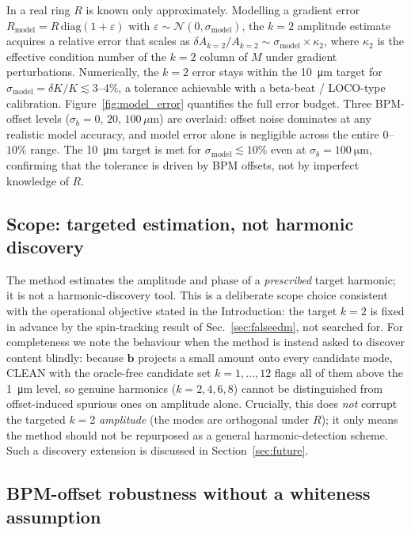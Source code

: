 \documentclass[preprint,12pt]{elsarticle}
\begin{document}
In a real ring $R$ is known only approximately. Modelling a gradient
error $R_\mathrm{model}=R\,\mathrm{diag}(1+\varepsilon)$ with
$\varepsilon\sim\mathcal{N}(0,\sigma_\mathrm{model})$, the $k=2$ amplitude
estimate acquires a relative error that scales as
$\delta A_{k=2}/A_{k=2}\sim\sigma_\mathrm{model}\times\kappa_2$, where
$\kappa_2$ is the effective condition number of the $k=2$ column of $M$
under gradient perturbations. Numerically, the $k=2$ error
stays within the \SI{10}{\micro\meter} target for
$\sigma_\mathrm{model}=\delta K/K\lesssim3\text{--}4\%$, a tolerance
achievable with a beta-beat / LOCO-type calibration.
Figure~\ref{fig:model_error} quantifies the full error budget.
Three BPM-offset levels ($\sigma_b = 0$, $20$, $100\,\mu$m) are overlaid:
offset noise dominates at any realistic model accuracy, and model error
alone is negligible across the entire $0$--$10\%$ range.
The \SI{10}{\micro\meter} target is met for $\sigma_\mathrm{model}\lesssim10\%$
even at $\sigma_b=\SI{100}{\micro\meter}$,
confirming that the tolerance is driven by BPM offsets, not by imperfect
knowledge of $R$.

\subsection{Scope: targeted estimation, not harmonic discovery}

The method estimates the amplitude and phase of a \emph{prescribed} target
harmonic; it is not a harmonic-discovery tool. This is a deliberate scope
choice consistent with the operational objective stated in the Introduction:
the target $k=2$ is fixed in advance by the spin-tracking result of
Sec.~\ref{sec:falseedm}, not searched for. For completeness we note the
behaviour when the method is instead asked to discover content blindly:
because $\mathbf{b}$ projects a small amount onto every candidate mode,
CLEAN with the oracle-free candidate set $k=1,\dots,12$ flags all of them
above the \SI{1}{\micro\meter} level, so genuine harmonics ($k=2,4,6,8$)
cannot be distinguished from offset-induced spurious ones on amplitude
alone. Crucially, this does \emph{not} corrupt the targeted $k=2$
\emph{amplitude} (the modes are orthogonal under $R$); it only means the
method should not be repurposed as a general harmonic-detection scheme.
Such a discovery extension is discussed in Section~\ref{sec:future}.

\subsection{BPM-offset robustness without a whiteness assumption}
\label{sec:whiteness}
\end{document}
